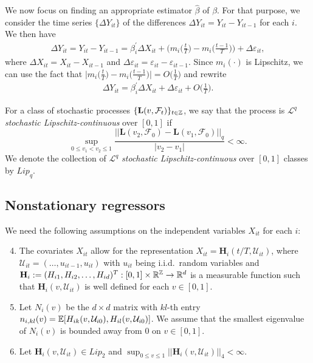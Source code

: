 \documentclass[a4paper,12pt]{article}
\begin{document}
We now focus on finding an appropriate estimator $\widehat{\beta}$ of $\beta$. For that purpose, we consider the time series $\{\Delta Y_{it}\}$ of the differences $\Delta Y_{it} = Y_{it} - Y_{i t-1}$ for each $i$. We then have
\begin{align*}
	\Delta Y_{it} = Y_{it} - Y_{i t-1} =\beta_i^\prime \Delta X_{it} + \bigg(m_i \Big( \frac{t}{T} \Big) - m_i \Big(\frac{t-1}{T}\Big)\bigg) + \Delta \varepsilon_{it},
\end{align*}
where $\Delta X_{it} = X_{it} - X_{it-1}$ and $ \Delta \varepsilon_{it} = \varepsilon_{it} - \varepsilon_{i t-1}$. Since $m_i(\cdot)$ is Lipschitz, we can use the fact that $ \big|m_i \big( \frac{t}{T} \big) - m_i \big(\frac{t-1}{T}\big) \big| = O\big(\frac{1}{T}\big)$ and rewrite 
\begin{align*}
	\Delta Y_{it} = \beta_i^\prime \Delta X_{it} + \Delta \varepsilon_{it} + O\Big(\frac{1}{T}\Big).
\end{align*}

For a class of stochastic processes $\{\mathbf{L}(v, \mathcal{F}_t)\}_{t\in\mathbb{Z}}$, we say that the process is $\mathcal{L}^q$ \textit{stochastic Lipschitz-continuous} over $[0,1]$ if
\[ \sup_{0\leq v_1 < v_2 \leq 1} \frac{||\mathbf{L}(v_2, \mathcal{F}_0) - \mathbf{L}(v_1, \mathcal{F}_0)||_q}{|v_2 - v_1|} < \infty.
\]
We denote the collection of $\mathcal{L}^q$ \textit{stochastic Lipschitz-continuous} over $[0,1]$ classes by $Lip_q$.

\subsection{Nonstationary regressors}

We need the following assumptions on the independent variables $X_{it}$ for each $i$:

\begin{enumerate}[label=(C\arabic*),leftmargin=1.05cm]
\setcounter{enumi}{3}

\item \label{C-reg1} The covariates $X_{it}$ allow for the representation $X_{it} = \mathbf{H}_i(t/T, \mathcal{U}_{it})$, where $\mathcal{U}_{it} =(\ldots,u_{it-1},u_{it})$ with $u_{it}$ being i.i.d.\ random variables and $\mathbf{H}_i := (H_{i1}, H_{i2}, \ldots, H_{id})^T: [0, 1] \times \mathbb{R}^{\mathbb{Z}} \rightarrow \mathbb{R}^d$ is a measurable function such that $\mathbf{H}_i(v, \mathcal{U}_{it})$ is well defined for each $v\in [0,1]$. 

\item \label{C-reg2} Let $N_i(v)$ be the $d\times d$ matrix with $kl$-th entry $n_{i, kl}(v) = \mathbb{E}[H_{ik}(v, \mathcal{U}_{i0}), H_{il}(v, \mathcal{U}_{i0})]$. We assume that the smallest eigenvalue of $N_i(v)$ is bounded away from $0$ on $v\in[0,1]$.

\item \label{C-reg3} Let $\mathbf{H}_{i}(v, \mathcal{U}_{it}) \in Lip_2$ and $\sup_{0\leq v\leq 1}||\mathbf{H}_{i}(v, \mathcal{U}_{it})||_4 <\infty$.
\end{enumerate}
\end{document}

